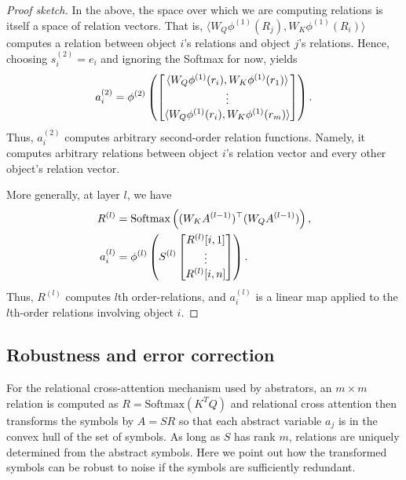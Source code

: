 \begin{proof}[Proof sketch]
	In the above, the space over which we are computing relations is itself a space of relation vectors. That is, $\langle W_Q \phi^{(1)}(R_j), W_K \phi^{(1)}(R_i) \rangle$ computes a relation between object $i$'s relations and object $j$'s relations. Hence, choosing $s_i^{(2)} = e_i$ and ignoring the Softmax for now, yields
	\begin{equation*}
		a_i^{(2)} = \phi^{(2)}\left(\begin{bmatrix}\langle W_Q \phi^{(1)}(r_i), W_K \phi^{(1)}(r_1) \rangle \\ \vdots \\ \langle W_Q \phi^{(1)}(r_i), W_K \phi^{(1)}(r_\m) \rangle\end{bmatrix}\right).
	\end{equation*}
	Thus, $a_i^{(2)}$ computes arbitrary second-order relation functions. Namely, it computes arbitrary relations between object $i$'s relation vector and every other object's relation vector.

	More generally, at layer $l$, we have
	\begin{align*}
		R^{(l)} &= \Softmax\left((W_K A^{(l-1)})^\top (W_Q A^{(l-1)})\right),\\
		a_i^{(l)} &= \phi^{(l)}\left(S^{(l)} \begin{bmatrix}R^{(l)}[i,1] \\ \vdots \\ R^{(l)}[i,n]\end{bmatrix}\right).
	\end{align*}
	Thus, $R^{(l)}$ computes $l$th order-relations, and $a_i^{(l)}$ is a linear map applied to the $l$th-order relations involving object $i$.
\end{proof}


\subsection{Robustness and error correction}

For the relational cross-attention mechanism used by abstrators, an $m\times m$ relation
is computed as  $R = \mbox{Softmax}(K^T Q)$
and relational cross attention then transforms the symbols by
$A = SR$ so that each abstract variable $a_j$ is in the convex hull of the set of symbols.
As long as $S$ has rank $m$, relations are uniquely determined from the abstract symbols.
Here we point out how the transformed symbols can be robust to noise if the symbols are
sufficiently redundant.

